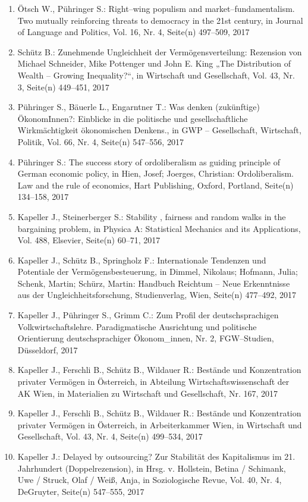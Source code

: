 \begin{enumerate}
    	 \item Ötsch W., Pühringer S.: Right--wing populism and market--fundamentalism. Two mutually reinforcing threats to democracy in the 21st century, in Journal of Language and Politics, Vol. 16, Nr. 4, Seite(n) 497--509, 2017
	 \item Schütz B.: Zunehmende Ungleichheit der Vermögensverteilung: Rezension von Michael Schneider, Mike Pottenger und John E. King „The Distribution of Wealth – Growing Inequality?“, in Wirtschaft und Gesellschaft, Vol. 43, Nr. 3, Seite(n) 449--451, 2017
	 \item Pühringer S., Bäuerle L., Engarntner T.: Was denken (zukünftige) ÖkonomInnen?: Einblicke in die politische und gesellschaftliche Wirkmächtigkeit ökonomischen Denkens., in GWP -- Gesellschaft, Wirtschaft, Politik, Vol. 66, Nr. 4, Seite(n) 547--556, 2017
	 \item Pühringer S.: The success story of ordoliberalism as guiding principle of German economic policy, in Hien, Josef; Joerges, Christian: Ordoliberalism. Law and the rule of economics, Hart Publishing, Oxford, Portland, Seite(n) 134--158, 2017
	 \item Kapeller J., Steinerberger S.: Stability , fairness and random walks in the bargaining problem, in Physica A: Statistical Mechanics and its Applications, Vol. 488, Elsevier, Seite(n) 60--71, 2017
	 \item Kapeller J., Schütz B., Springholz F.: Internationale Tendenzen und Potentiale der Vermögensbesteuerung, in Dimmel, Nikolaus; Hofmann, Julia; Schenk, Martin; Schürz, Martin: Handbuch Reichtum – Neue Erkenntnisse aus der Ungleichheitsforschung, Studienverlag, Wien, Seite(n) 477--492, 2017
	 \item Kapeller J., Pühringer S., Grimm C.: Zum Profil der deutschsprachigen Volkwirtschaftslehre. Paradigmatische Ausrichtung und politische Orientierung deutschsprachiger Ökonom\_innen, Nr. 2, FGW--Studien, Düsseldorf, 2017
	 \item Kapeller J., Ferschli B., Schütz B., Wildauer R.: Bestände und Konzentration privater Vermögen in Österreich, in Abteilung Wirtschaftswissenschaft der AK Wien, in Materialien zu Wirtschaft und Gesellschaft, Nr. 167, 2017
	 \item Kapeller J., Ferschli B., Schütz B., Wildauer R.: Bestände und Konzentration privater Vermögen in Österreich, in Arbeiterkammer Wien, in Wirtschaft und Gesellschaft, Vol. 43, Nr. 4, Seite(n) 499--534, 2017
	 \item Kapeller J.: Delayed by outsourcing? Zur Stabilität des Kapitalismus im 21. Jahrhundert (Doppelrezension), in Hrsg. v. Hollstein, Betina / Schimank, Uwe / Struck, Olaf / Weiß, Anja, in Soziologische Revue, Vol. 40, Nr. 4, DeGruyter, Seite(n) 547–555, 2017

\end{enumerate}

